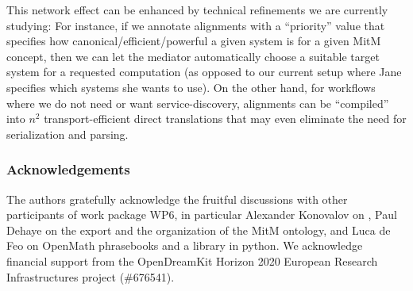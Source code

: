 This network effect can be enhanced by technical refinements we are currently studying:
For instance, if we annotate alignments with a ``priority'' value that specifies how canonical/efficient/powerful a given system is for a given MitM concept, then we can let
the \MMT mediator automatically choose a suitable target system for a requested computation (as opposed to our current setup where Jane specifies which systems she wants to use). On the other hand, for workflows where we do not need or want service-discovery, alignments can be ``compiled'' into $n^2$ transport-efficient direct translations that may even eliminate the need for serialization and parsing.

\subsubsection*{Acknowledgements}
The authors gratefully acknowledge the fruitful discussions with other participants of
work package WP6, in particular Alexander Konovalov on \SCSCP, Paul Dehaye on the \Sage
export and the organization of the MitM ontology, and Luca de Feo on OpenMath phrasebooks
and a \SCSCP library in python.  We acknowledge financial support from the OpenDreamKit
Horizon 2020 European Research Infrastructures project (\#676541).


